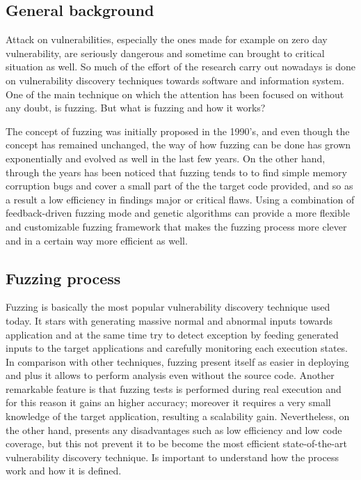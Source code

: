 \subsection{General background}

Attack on vulnerabilities, especially the ones made for example on zero day vulnerability, are seriously dangerous and sometime can brought to critical situation as well.
So much of the effort of the research carry out nowadays is done on vulnerability discovery techniques towards software and information system. One of the main technique on 
which the attention has been focused on without any doubt, is fuzzing. But what is fuzzing and how it works? 

The concept of fuzzing was initially proposed in the 1990's, and even though the concept has remained unchanged,
the way of how fuzzing can be done has grown exponentially and evolved as well in the last few years. On the other hand, through the years has been noticed that fuzzing tends to
to find simple memory corruption bugs and cover a small part of the the target code provided, and so as a result a low efficiency in findings major or critical flaws.
Using a combination of feedback-driven fuzzing mode and genetic algorithms can provide a more flexible and customizable fuzzing framework that makes the fuzzing process more clever and in a certain way more efficient as well.


\subsection{Fuzzing process}

Fuzzing is basically the most popular vulnerability discovery technique used today.
It stars with generating massive normal and abnormal inputs towards application and at the same time try to detect exception by feeding generated inputs to the target applications and carefully monitoring each execution states.
In comparison with other techniques, fuzzing present itself as easier in deploying and plus it allows to perform analysis even without the source code. Another remarkable feature is that fuzzing tests is performed during real execution
and for this reason it gains an higher accuracy; moreover it requires a very small knowledge of the target application, resulting a scalability gain. 
Nevertheless, on the other hand, presents any disadvantages such as low efficiency and low code coverage, but this not prevent it to be become the most efficient state-of-the-art
vulnerability discovery technique. Is important to understand how the process work and how it is defined.

